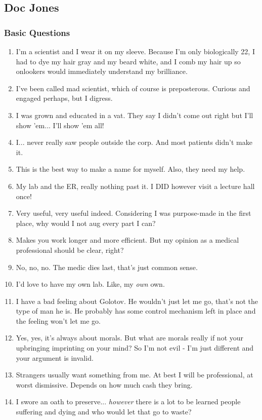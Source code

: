 \def\pfcname{Doc Jones}
\subsection{\pfcname}
\subsubsection{Basic Questions}
\begin{enumerate}
	\setlength\itemsep{-10mm}
	\item I'm a scientist and I wear it on my sleeve. Because I'm only biologically 22, I had to dye my hair gray and my beard white, and I comb my hair up so onlookers would immediately understand my brilliance.
	\item I've been called mad scientist, which of course is preposterous. Curious and engaged perhaps, but I digress.
	\item I was grown and educated in a vat. They say I didn't come out right but I'll show 'em... I'll show 'em all!
	\item I... never really saw people outside the corp. And most patients didn't make it.
	\item This is the best way to make a name for myself. Also, they need my help.
	\item My lab and the ER, really nothing past it. I DID however visit a lecture hall once!
	\item Very useful, very useful indeed. Considering I was purpose-made in the first place, why would I not aug every part I can?
	\item Makes you work longer and more efficient. But my opinion as a medical professional should be clear, right?
	\item No, no, no. The medic dies last, that's just common sense.
	\item I'd love to have my own lab. Like, my \textit{own} own.
	\item I have a bad feeling about Golotov. He wouldn't just let me go, that's not the type of man he is. He probably has some control mechanism left in place and the feeling won't let me go.
	\item Yes, yes, it's always about morals. But what are morals really if not your upbringing imprinting on your mind? So I'm not evil - I'm just different and your argument is invalid.
	\item Strangers usually want something from me. At best I will be professional, at worst dismissive. Depends on how much cash they bring.
	\item I swore an oath to preserve... \textit{however} there is a lot to be learned people suffering and dying and who would let that go to waste?

\end{enumerate}
